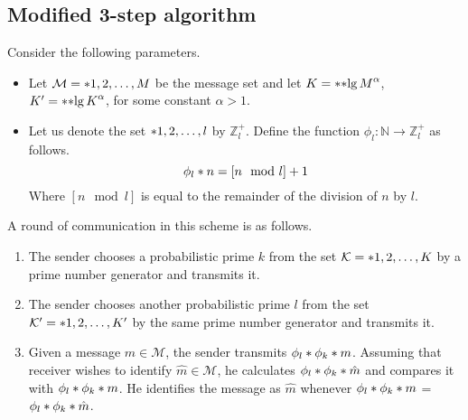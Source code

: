 \subsection{Modified 3-step algorithm}
Consider the following parameters.
\begin{itemize}
	\item Let \(\mathcal{M} = \set{1,2, \dots, M }\) be the message set and let \(K = \ceil{\bracket{\lg M}^{\alpha}}\), \(K' = \ceil{\bracket{\lg K}^{\alpha}}\),  for some constant \(\alpha > 1\). 
	\item Let us denote the set \(\set{1,2, \dots, l }\) by \(\mathbb{Z}^+_l\).  Define the function \(\phi_l: \mathbb{N} \to \mathbb{Z}_{l}^+ \) as follows.
	\begin{equation}
		\func{\phi_l}{n}= [n \mod l] + 1
	\end{equation}
	Where \([n \mod l]\) is equal to the remainder of the division of \(n\) by \(l\).
\end{itemize}

A round of communication in this scheme is as follows.
\begin{enumerate}
	\item The sender chooses a probabilistic prime \(k\) from the set \(\mathcal{K} = \set{1,2,\dots, K}\) by a prime number generator and transmits it.
	\item The sender chooses another probabilistic prime \(l\) from the set \( \mathcal{K}' = \set{1,2,\dots, K'}\) by the same prime number generator and transmits it.
	\item Given a message \(m \in \mathcal{M}\), the sender transmits \(\func{\phi_l}{\func{\phi_k}{m}}\). Assuming that receiver wishes to identify \(\hat{m} \in \mathcal{M}\), he calculates \(\func{\phi_l}{\func{\phi_k}{\hat{m}}}\) and compares it with \(\func{\phi_l}{\func{\phi_k}{m}}\). He identifies the message as \(\hat{m}\) whenever \(\func{\phi_l}{\func{\phi_k}{m}}\) = \(\func{\phi_l}{\func{\phi_k}{\hat{m}}}\).
\end{enumerate}


